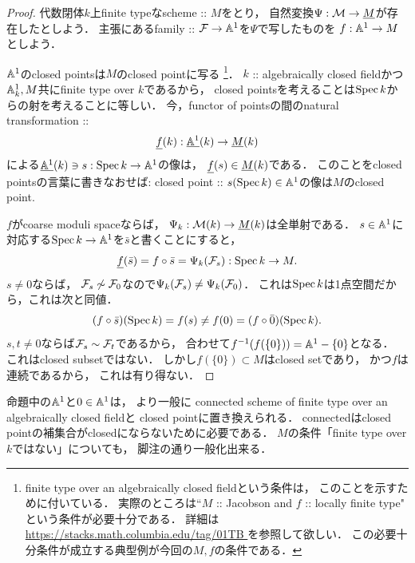 \documentclass[a4paper]{jsarticle}
\begin{document}
    \begin{proof}
        代数閉体$k$上finite typeなscheme :: $M$をとり，
        自然変換$\Psi: \mathcal{M} \to \underline{M}$が存在したとしよう．
        主張にあるfamily :: $\mathcal{F} \to \mathbb{A}^1$を$\Psi$で写したものを
        $f: \mathbb{A}^1 \to M$としよう．

        $\mathbb{A}^1$のclosed pointsは$M$のclosed pointに写る
        \footnote
        {
            finite type over an algebraically closed fieldという条件は，
            このことを示すために付いている．
            実際のところは``$M$ :: Jacobson and $f$ :: locally finite type"
            という条件が必要十分である．
            詳細は\url{ https://stacks.math.columbia.edu/tag/01TB }を参照して欲しい．
            この必要十分条件が成立する典型例が今回の$M,f$の条件である．
        }．
        $k$ :: algebraically closed fieldかつ
        $\mathbb{A}_k^1, M$共にfinite type over $k$であるから，
        closed pointsを考えることは$\operatorname{Spec} k$からの射を考えることに等しい．
        今，functor of pointsの間のnatural transformation :: 
        \[ \underline{f}(k): \underline{\mathbb{A}^1}(k) \to \underline{M}(k) \]
        による$\underline{\mathbb{A}^1}(k) \ni s: \operatorname{Spec} k \to \mathbb{A}^1$の像は，
        $\underline{f}(s) \in \underline{M}(k)$である．
        このことをclosed pointsの言葉に書きなおせば:
        closed point :: $s(\operatorname{Spec} k) \in \mathbb{A}^1$の像は$M$のclosed point.
        
        $f$がcoarse moduli spaceならば，
        $\Psi_k: \mathcal{M}(k) \to \underline{M}(k)$は全単射である．
        $s \in \mathbb{A}^1$に対応する$\operatorname{Spec} k \to \mathbb{A}^1$を$\bar{s}$と書くことにすると，
        \[ \underline{f}(\bar{s})=f \circ \bar{s}=\Psi_k(\mathcal{F}_s): \operatorname{Spec} k \to M. \]
        $s \neq 0$ならば，
        $\mathcal{F}_s \not \sim \mathcal{F}_0$なので$\Psi_k(\mathcal{F}_s) \neq \Psi_k(\mathcal{F}_0)$．
        これは$\operatorname{Spec} k$は1点空間だから，これは次と同値．
        \[ (f \circ \bar{s})(\operatorname{Spec} k)=f(s) \neq f(0)=(f \circ \bar{0})(\operatorname{Spec} k). \]
        $s, t \neq 0$ならば$\mathcal{F}_s \sim \mathcal{F}_t$であるから，
        合わせて$f^{-1}(f(\{0\}))=\mathbb{A}^1-\{0\}$となる．
        これはclosed subsetではない．
        しかし$f(\{0\}) \subset M$はclosed setであり，
        かつ$f$は連続であるから，
        これは有り得ない．
    \end{proof}
    \begin{Remark}
        命題中の$\mathbb{A}^1$と$0 \in \mathbb{A}^1$は，
        より一般に
        connected scheme of finite type over an algebraically closed fieldと
        closed pointに置き換えられる．
        connectedはclosed pointの補集合がclosedにならないために必要である．
        $M$の条件「finite type over $k$ではない」についても，
        脚注の通り一般化出来る．
    \end{Remark}
\end{document}
